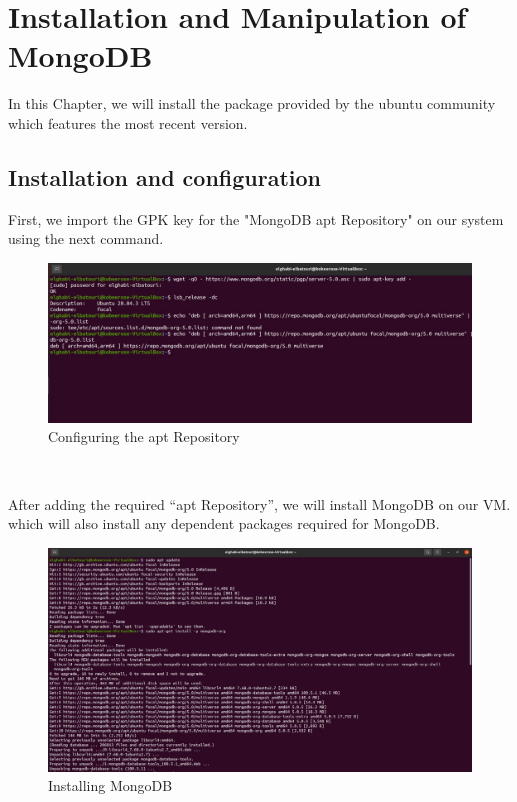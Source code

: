 \chapter{Installation and Manipulation of MongoDB}
\par In this Chapter, we will install the package provided by the ubuntu community which features the most recent version.

\begin{spacing}{1.2}
\section{Installation and configuration }
\par First, we import the GPK key for the "MongoDB apt Repository" on our system using the
next command.
\\
\begin{figure}[!htb] 
\begin{center} 
\includegraphics[width=1\linewidth]{Pictures/MongoDB/Installation and manipulation of MongoDB/Installation and configuration/Configuring the apt Repository} 
\end{center} 
\caption{Configuring the apt Repository} 
\end{figure}  \FloatBarrier
\\
\newpage
\par After adding the required “apt Repository”, we will install
MongoDB on our VM. which will also install any dependent packages required for MongoDB.
\\
\begin{figure}[!htb] 
\begin{center} 
\includegraphics[width=1\linewidth]{Pictures/MongoDB/Installation and manipulation of MongoDB/Installation and configuration/Installing MongoDB} 
\end{center} 
\caption{Installing MongoDB} 
\end{figure}  \FloatBarrier
\\


\end{spacing}
